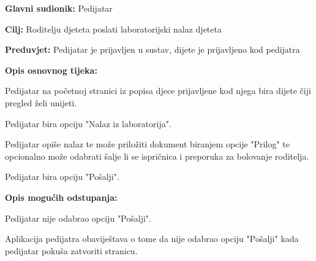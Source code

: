 					\noindent {}
					\begin{packed_item}
						
						\item \textbf{Glavni sudionik: }Pedijatar
						\item  \textbf{Cilj:} Roditelju djeteta poslati laboratorijski nalaz djeteta
						\item  \textbf{Preduvjet:} Pedijatar je prijavljen u sustav, dijete je prijavljeno kod pedijatra
						\item  \textbf{Opis osnovnog tijeka:}
						
						\item[] \begin{packed_enum}
							
							\item Pedijatar na početnoj stranici iz popisa djece prijavljene kod njega bira dijete čiji pregled želi unijeti.
							\item Pedijatar bira opciju "Nalaz iz laboratorija".
							\item Pedijatar opiše nalaz te može priložiti dokument biranjem opcije "Prilog" te opcionalno može odabrati šalje li se ispričnica i preporuka za bolovanje roditelja.
							\item Pedijatar bira opciju "Pošalji".
						\end{packed_enum}
						
						\item  \textbf{Opis mogućih odstupanja:}
						
						\item[] \begin{packed_item}
							
							\item[4.a] Pedijatar nije odabrao opciju "Pošalji".
							\item[] \begin{packed_enum}
								
								\item Aplikacija pedijatra obaviještava o tome da nije odabrao opciju "Pošalji" kada pedijatar pokuša zatvoriti stranicu.
							\end{packed_enum}
							
							
						\end{packed_item}
						
						
					\end{packed_item}
					
